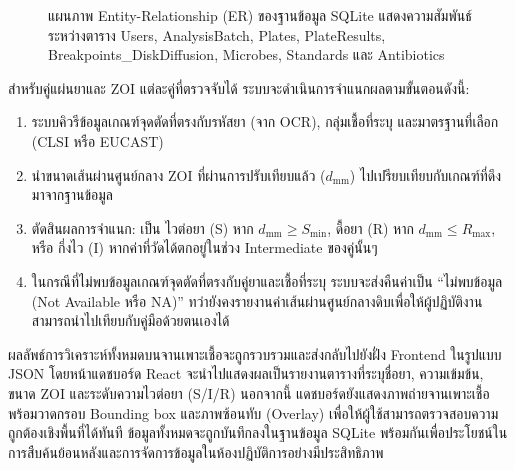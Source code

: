 \begin{figure}[H]
  \centering
  \caption{แผนภาพ Entity-Relationship (ER) ของฐานข้อมูล SQLite แสดงความสัมพันธ์ระหว่างตาราง
    Users, AnalysisBatch, Plates, PlateResults, Breakpoints\_DiskDiffusion, Microbes,
    Standards และ Antibiotics}
  \label{fig:db_schema}
\end{figure}

สำหรับคู่แผ่นยาและ ZOI แต่ละคู่ที่ตรวจจับได้ ระบบจะดำเนินการจำแนกผลตามขั้นตอนดังนี้:
\begin{enumerate}
  \item ระบบคิวรีข้อมูลเกณฑ์จุดตัดที่ตรงกับรหัสยา (จาก OCR), กลุ่มเชื้อที่ระบุ และมาตรฐานที่เลือก (CLSI หรือ EUCAST)
  \item นำขนาดเส้นผ่านศูนย์กลาง ZOI ที่ผ่านการปรับเทียบแล้ว ($d_{\mathrm{mm}}$) ไปเปรียบเทียบกับเกณฑ์ที่ดึงมาจากฐานข้อมูล
  \item ตัดสินผลการจำแนก: เป็น ไวต่อยา (S) หาก $d_{\mathrm{mm}} \geq S_{\min}$, ดื้อยา (R) หาก $d_{\mathrm{mm}} \leq R_{\max}$, หรือ กึ่งไว (I) หากค่าที่วัดได้ตกอยู่ในช่วง Intermediate ของคู่นั้นๆ
  \item ในกรณีที่ไม่พบข้อมูลเกณฑ์จุดตัดที่ตรงกับคู่ยาและเชื้อที่ระบุ ระบบจะส่งคืนค่าเป็น ``ไม่พบข้อมูล (Not Available หรือ NA)'' ทว่ายังคงรายงานค่าเส้นผ่านศูนย์กลางดิบเพื่อให้ผู้ปฏิบัติงานสามารถนำไปเทียบกับคู่มือด้วยตนเองได้
\end{enumerate}

ผลลัพธ์การวิเคราะห์ทั้งหมดบนจานเพาะเชื้อจะถูกรวบรวมและส่งกลับไปยังฝั่ง Frontend ในรูปแบบ JSON โดยหน้าแดชบอร์ด React จะนำไปแสดงผลเป็นรายงานตารางที่ระบุชื่อยา, ความเข้มข้น, ขนาด ZOI และระดับความไวต่อยา (S/I/R) นอกจากนี้ แดชบอร์ดยังแสดงภาพถ่ายจานเพาะเชื้อพร้อมวาดกรอบ Bounding box และภาพซ้อนทับ (Overlay) เพื่อให้ผู้ใช้สามารถตรวจสอบความถูกต้องเชิงพื้นที่ได้ทันที ข้อมูลทั้งหมดจะถูกบันทึกลงในฐานข้อมูล SQLite พร้อมกันเพื่อประโยชน์ในการสืบค้นย้อนหลังและการจัดการข้อมูลในห้องปฏิบัติการอย่างมีประสิทธิภาพ
